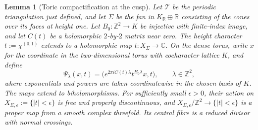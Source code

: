 \documentclass[10pt,a4paper]{amsart}
\newtheorem{lemma}{Lemma}
\newcommand{\CC}{\mathbb C}
\newcommand{\ZZ}{\mathbb Z}
\begin{document}
\begin{lemma}[Toric compactification at the cusp]\label{lem:an-finite-index-cusp}
Let $\mathcal T$ be the periodic triangulation just defined, and let
$\Sigma$ be the fan in
$K_{\mathbb R}\oplus\mathbb R$ consisting of the cones over its faces
at height one.  Let $B_0:\ZZ^2\to K$ be injective with finite-index
image, and let $C(t)$ be a holomorphic $2$-by-$2$ matrix near zero.
The height character $t:=\chi^{(0,1)}$ extends to a holomorphic map
$t:X_\Sigma\to\CC$.  On the dense torus, write $x$ for the coordinate
in the two-dimensional torus with cocharacter lattice $K$, and define
\begin{equation}\label{eq:an-toric-action}
 \Psi_\lambda(x,t)
 =\bigl(e^{2\pi iC(t)\lambda}t^{B_0\lambda}x,t\bigr),
 \qquad \lambda\in\ZZ^2,
\end{equation}
where exponentials and powers are taken coordinatewise in the chosen basis
of $K$.  The maps extend to biholomorphisms.  For sufficiently
small $\epsilon>0$, their action on
$X_{\Sigma,\epsilon}:=\{|t|<\epsilon\}$ is free and properly
discontinuous, and
$X_{\Sigma,\epsilon}/\ZZ^2\to\{|t|<\epsilon\}$ is a proper map from a
smooth complex threefold.  Its central fibre is a reduced divisor with
normal crossings.
\end{lemma}
\end{document}
